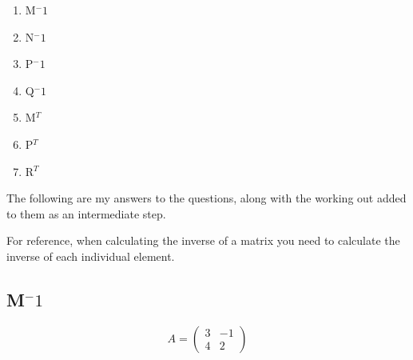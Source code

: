 \documentclass[a4paper,12pt]{article}
\begin{document}
        \begin{enumerate}
          \item M$^-1$
          \item N$^-1$
          \item P$^-1$
          \item Q$^-1$
          \item M$^T$
          \item P$^T$
          \item R$^T$
        \end{enumerate}

        The following are my answers to the questions, along with the working out added to them as an intermediate step.

        For reference, when calculating the inverse of a matrix you need to calculate the inverse of each individual element.

        \subsection{M$^-1$}
        \begin{equation}
          A =
          \begin{pmatrix}
            3 & -1\\
            4 &  2
          \end{pmatrix}
        \end{equation}
\end{document}

